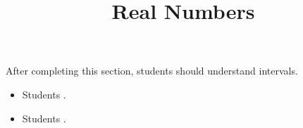 \documentclass{ximera}
\title{Real Numbers}
\begin{document}
\begin{abstract}
\end{abstract}

\maketitle

\begin{sectionOutcomes}

After completing this section, students should understand intervals. 

\begin{itemize}
\item Students .
\item Students .
\end{itemize}

\end{sectionOutcomes}
\end{document}
